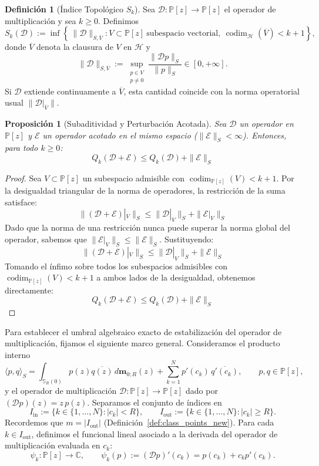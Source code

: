 \documentclass[12pt,a4paper]{article}
\newtheorem{proposition}{Proposición}
\theoremstyle{definition}
\newtheorem{definition}{Definición}
\theoremstyle{remark}
\newcommand{\Poly}{\mathbb{P}[z]}
\newcommand{\D}{\mathcal{D}}
\begin{document}
\begin{definition}[Índice Topológico $S_k$]\label{def:indice_Sk}
  Sea $\D:\Poly\to\Poly$ el operador de multiplicación y sea $k\ge 0$. Definimos
  \[
    S_k(\D)
    :=
    \inf\!\left\{\,\|\D\|_{S,\overline{V}}:
    V\subset\Poly\ \text{subespacio vectorial},\ \operatorname{codim}_{\mathcal{H}}(\overline{V})<k+1\right\},
  \]
  donde $\overline{V}$ denota la clausura de $V$ en $\mathcal{H}$ y
  \[
    \|\D\|_{S,\overline{V}}
    :=
    \sup_{\substack{p\in V\\ p\neq 0}}\frac{\|\D p\|_S}{\|p\|_S}
    \in [0,+\infty].
  \]
  Si $\D$ extiende continuamente a $\overline{V}$, esta cantidad coincide con la norma operatorial usual $\|\D|_{\overline{V}}\|$.
\end{definition}

\begin{proposition}[Subaditividad y Perturbación Acotada]\label{prop:Qk_perturbacion}
  Sea $\D$ un operador en $\Poly$ y $\mathcal{E}$ un operador acotado en el mismo espacio ($\|\mathcal{E}\|_S < \infty$). Entonces, para todo $k \ge 0$:
  $$ Q_k(\D + \mathcal{E}) \le Q_k(\D) + \|\mathcal{E}\|_S $$
\end{proposition}

\begin{proof}
  Sea $V \subset \Poly$ un subespacio admisible con $\operatorname{codim}_{\Poly}(V) < k+1$. Por la desigualdad triangular de la norma de operadores, la restricción de la suma satisface:
  $$ \|(\D + \mathcal{E})|_V\|_S \le \|\D|_V\|_S + \|\mathcal{E}|_V\|_S $$
  Dado que la norma de una restricción nunca puede superar la norma global del operador, sabemos que $\|\mathcal{E}|_V\|_S \le \|\mathcal{E}\|_S$. Sustituyendo:
  $$ \|(\D + \mathcal{E})|_V\|_S \le \|\D|_V\|_S + \|\mathcal{E}\|_S $$
  Tomando el ínfimo sobre todos los subespacios admisibles con $\operatorname{codim}_{\Poly}(V)<k+1$ a ambos lados de la desigualdad, obtenemos directamente:
  $$ Q_k(\D + \mathcal{E}) \le Q_k(\D) + \|\mathcal{E}\|_S $$
\end{proof}

Para establecer el umbral algebraico exacto de estabilización del operador de multiplicación, fijamos el siguiente marco general. Consideramos el producto interno
\[
  \langle p,q\rangle_S
  =
  \int_{\mathbb{S}_R(0)} p(z)\overline{q(z)} \, d\mathbf{m}_{0;R}(z)
  +
  \sum_{k=1}^N p'(c_k)\,\overline{q'(c_k)},
  \qquad p,q\in\Poly,
\]
y el operador de multiplicación $\D:\Poly\to\Poly$ dado por $(\D p)(z)=z\,p(z)$. Separamos el conjunto de índices en
\[
  I_{\mathrm{in}}:=\{k\in\{1,\dots,N\}: |c_k|<R\},
  \qquad
  I_{\mathrm{out}}:=\{k\in\{1,\dots,N\}: |c_k|\ge R\}.
\]
Recordemos que $m=|I_{\mathrm{out}}|$ (Definición~\ref{def:class_points_new}).
Para cada $k\in I_{\mathrm{out}}$, definimos el funcional lineal asociado a la derivada del operador de multiplicación evaluada en $c_k$:
\[
  \psi_k:\Poly\to\mathbb C,
  \qquad
  \psi_k(p):=(\D p)'(c_k)=p(c_k)+c_kp'(c_k).
\]
\end{document}
